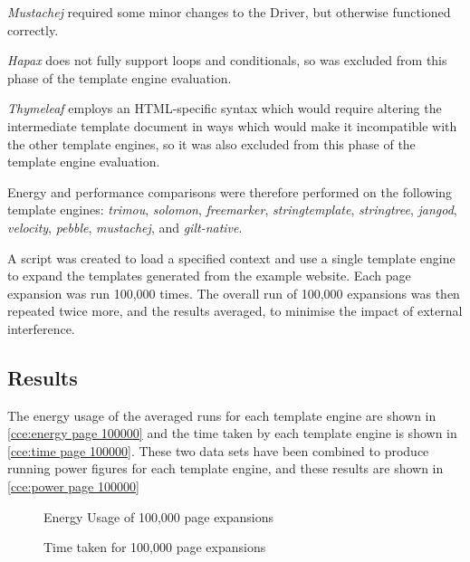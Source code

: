 \emph{Mustachej} required some minor changes to the Driver, but otherwise functioned correctly.

\emph{Hapax} does not fully support loops and conditionals, so was excluded from this phase of the template engine evaluation.

\emph{Thymeleaf} employs an HTML-specific syntax which would require altering the intermediate template document in ways which would make it incompatible with the other template engines, so it was also excluded from this phase of the template engine evaluation.

Energy and performance comparisons were therefore performed on the following template engines:
\emph{trimou},
\emph{solomon},
\emph{freemarker},
\emph{stringtemplate},
\emph{stringtree},
\emph{jangod},
\emph{velocity},
\emph{pebble},
\emph{mustachej},
and \emph{gilt-native}.

A script was created to load a specified context and use a single template engine to expand the templates generated from the example website. Each page expansion was run 100,000 times. The overall run of 100,000 expansions was then repeated twice more, and the results averaged, to minimise the impact of external interference.

\subsection{Results}
\label{cce results}

The energy usage of the averaged runs for each template engine are shown in \autoref{cce:energy page 100000} and the time taken by each template engine is shown in \autoref{cce:time page 100000}. These two data sets have been combined to produce running power figures for each template engine, and these results are shown in \autoref{cce:power page 100000}

\begin{figure}[htbp]
  \centering
  
  \caption{Energy Usage of 100,000 page expansions}
  \label{cce:energy page 100000}
\end{figure}

\begin{figure}[htbp]
  \centering
  
  \caption{Time taken for 100,000 page expansions}
  \label{cce:time page 100000}
\end{figure}

